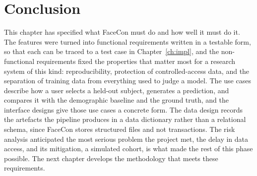\section{Conclusion}
This chapter has specified what FaceCon must do and how well it must do it. The features were turned into functional requirements written in a testable form, so that each can be traced to a test case in Chapter~\ref{ch:impl}, and the non-functional requirements fixed the properties that matter most for a research system of this kind: reproducibility, protection of controlled-access data, and the separation of training data from everything used to judge a model. The use cases describe how a user selects a held-out subject, generates a prediction, and compares it with the demographic baseline and the ground truth, and the interface designs give those use cases a concrete form. The data design records the artefacts the pipeline produces in a data dictionary rather than a relational schema, since FaceCon stores structured files and not transactions. The risk analysis anticipated the most serious problem the project met, the delay in data access, and its mitigation, a simulated cohort, is what made the rest of this phase possible. The next chapter develops the methodology that meets these requirements.
